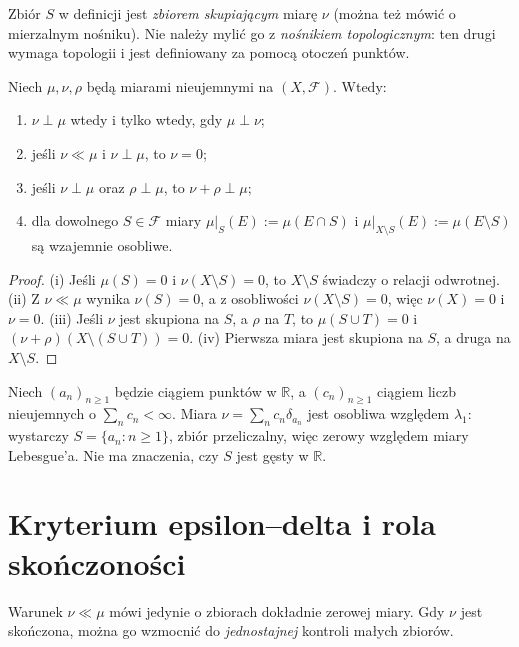Zbiór $S$ w definicji jest \emph{zbiorem skupiającym}
miarę $\nu$ (można też mówić o mierzalnym nośniku). Nie należy mylić go z
\emph{nośnikiem topologicznym}: ten drugi wymaga topologii
i jest definiowany za pomocą otoczeń punktów.

\begin{lemat}
\label{lem:singularity-17}
Niech $\mu,\nu,\rho$ będą miarami nieujemnymi na $(X,\mathcal F)$.
Wtedy:
\begin{enumerate}[label=\textup{(\roman*)}]
\item $\nu\perp\mu$ wtedy i tylko wtedy, gdy $\mu\perp\nu$;
\item jeśli $\nu\ll\mu$ i $\nu\perp\mu$, to $\nu=0$;
\item jeśli $\nu\perp\mu$ oraz $\rho\perp\mu$, to
$\nu+\rho\perp\mu$;
\item dla dowolnego $S\in\mathcal F$ miary
$\mu|_S(E):=\mu(E\cap S)$ i
$\mu|_{X\setminus S}(E):=\mu(E\setminus S)$ są wzajemnie osobliwe.
\end{enumerate}
\end{lemat}
\begin{proof}
(i) Jeśli $\mu(S)=0$ i $\nu(X\setminus S)=0$, to
$X\setminus S$ świadczy o relacji odwrotnej.
(ii) Z $\nu\ll\mu$ wynika $\nu(S)=0$, a z osobliwości
$\nu(X\setminus S)=0$, więc $\nu(X)=0$ i $\nu=0$.
(iii) Jeśli $\nu$ jest skupiona na $S$, a $\rho$ na $T$,
to $\mu(S\cup T)=0$ i $(\nu+\rho)(X\setminus(S\cup T))=0$.
(iv) Pierwsza miara jest skupiona na $S$, a druga na $X\setminus S$.
\end{proof}

\begin{przyklad}
Niech $(a_n)_{n\ge1}$ będzie ciągiem punktów w $\mathbb R$, a
$(c_n)_{n\ge1}$ ciągiem liczb nieujemnych o
$\sum_nc_n<\infty$. Miara $\nu=\sum_nc_n\delta_{a_n}$
jest osobliwa względem $\lambda_1$: wystarczy
$S=\{a_n:n\ge1\}$, zbiór przeliczalny, więc zerowy
względem miary Lebesgue'a. Nie ma znaczenia, czy $S$ jest
gęsty w $\mathbb R$.
\end{przyklad}

\section{Kryterium epsilon--delta i rola skończoności}
Warunek $\nu\ll\mu$ mówi jedynie o zbiorach dokładnie zerowej
miary. Gdy $\nu$ jest skończona, można go wzmocnić do
\emph{jednostajnej} kontroli małych zbiorów.


